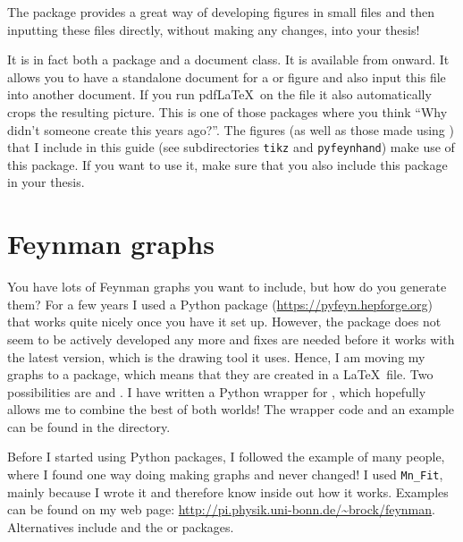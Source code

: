 The  package provides a great way of developing
figures in small files and then inputting these files directly,
without making any changes, into your thesis!

It is in fact both a package and a document class. It is
available from  onward. It allows you to have a
standalone document for a \Package{\TikZ} or  figure
and also input this file into another document. If you run pdf\LaTeX\
on the file it also automatically crops the resulting picture. This is
one of those packages where you think
\enquote{Why didn't someone create this years ago?}.
The \TikZ figures (as well as those made using )
that I include in this guide (see subdirectories \texttt{tikz} and \texttt{pyfeynhand})
make use of this package.
If you want to use it, make sure that you also include this package in
your thesis.


\section{Feynman graphs}%
\label{sec:fig:feynman}

You have lots of Feynman graphs you want to include, but how do you
generate them? 
For a few years I used a Python package  (\url{https://pyfeyn.hepforge.org})
that works quite nicely once you have it set up.
However, the package does not seem to be actively developed any more
and fixes are needed before it works with the latest \Package{PyX} version,
which is the drawing tool it uses.
Hence, I am moving my graphs to a \TikZ package, which means that they are created in a \LaTeX\ file.
Two possibilities are \Package{TikZ-Feynman} and .
I have written a Python wrapper for \Package{TikZ-FeynHand},
which hopefully allows me to combine the best of both worlds!
The wrapper code and an example can be found in the  directory.

Before I started using Python packages, I followed the example of many people,
where I found one way doing making graphs and never changed!
I used \texttt{Mn\_Fit},
mainly because I wrote it and therefore know inside out how it works.
Examples can be found on my web page:
\url{http://pi.physik.uni-bonn.de/~brock/feynman}.
Alternatives include  and the  or
\Package{feynmp} packages.

